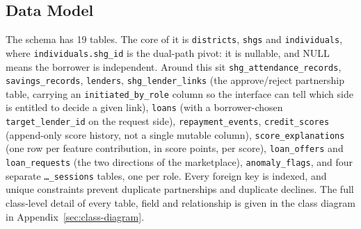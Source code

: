 \documentclass[11pt,a4paper]{article}
\begin{document}
\subsection{Data Model}
The schema has 19 tables. The core of it is \texttt{districts},
\texttt{shgs} and \texttt{individuals}, where \texttt{individuals.shg\_id}
is the dual-path pivot: it is nullable, and NULL means the borrower is
independent. Around this sit \texttt{shg\_attendance\_records},
\texttt{savings\_records}, \texttt{lenders},
\texttt{shg\_lender\_links} (the approve/reject partnership table, carrying
an \texttt{initiated\_by\_role} column so the interface can tell which side
is entitled to decide a given link), \texttt{loans} (with a
borrower-chosen \texttt{target\_lender\_id} on the request side),
\texttt{repayment\_events}, \texttt{credit\_scores} (append-only score
history, not a single mutable column), \texttt{score\_explanations} (one
row per feature contribution, in score points, per score),
\texttt{loan\_offers} and \texttt{loan\_requests} (the two directions of
the marketplace), \texttt{anomaly\_flags}, and four separate
\texttt{\ldots\_sessions} tables, one per role. Every foreign key is
indexed, and unique constraints prevent duplicate partnerships and
duplicate declines. The full class-level detail of every table, field and
relationship is given in the class diagram in
Appendix~\ref{sec:class-diagram}.
\end{document}
